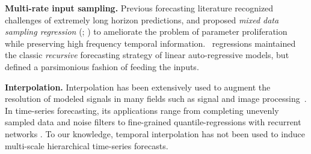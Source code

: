 \textbf{Multi-rate input sampling.} Previous forecasting literature recognized challenges of extremely long horizon predictions, and proposed \emph{mixed data sampling regression} (\MIDAS; \citealt{ghysels2007midas_regressions, armesto2010ForecastingWMF}) to ameliorate the problem of parameter proliferation while preserving high frequency temporal information. \MIDAS\ regressions maintained the classic \emph{recursive} forecasting strategy of linear auto-regressive models, but defined a parsimonious fashion of feeding the inputs. 

\textbf{Interpolation.} Interpolation has been extensively used to augment the resolution of modeled signals in many fields such as signal and image processing~\citep{meijering2002interpolation_history}. In time-series forecasting, its applications range from completing unevenly sampled data and noise filters \cite{chow1971interpolation_extrapolation_time_series, roque1981interpolation_time_series_note, shukla2019interpolation_prediction_networks, rubanova2019latent_odes_irregular_sample} to fine-grained quantile-regressions with recurrent networks \citep{gasthaus2019spline_quantile_function}. To our knowledge, temporal interpolation has not been used to induce multi-scale hierarchical time-series forecasts.
